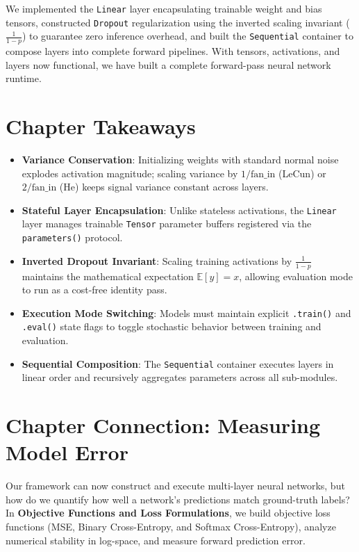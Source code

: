 \documentclass[
  letterpaper,
]{scrbook}
\providecommand{\tightlist}{%
  \setlength{\itemsep}{0pt}\setlength{\parskip}{0pt}}
\begin{document}
We implemented the \texttt{Linear} layer encapsulating trainable weight
and bias tensors, constructed \texttt{Dropout} regularization using the
inverted scaling invariant (\(\frac{1}{1-p}\)) to guarantee zero
inference overhead, and built the \texttt{Sequential} container to
compose layers into complete forward pipelines. With tensors,
activations, and layers now functional, we have built a complete
forward-pass neural network runtime.

\section{Chapter Takeaways}\label{chapter-takeaways-3}

\begin{itemize}
\tightlist
\item
  \textbf{Variance Conservation}: Initializing weights with standard
  normal noise explodes activation magnitude; scaling variance by
  \(1/\text{fan\_in}\) (LeCun) or \(2/\text{fan\_in}\) (He) keeps signal
  variance constant across layers.
\item
  \textbf{Stateful Layer Encapsulation}: Unlike stateless activations,
  the \texttt{Linear} layer manages trainable \texttt{Tensor} parameter
  buffers registered via the \texttt{parameters()} protocol.
\item
  \textbf{Inverted Dropout Invariant}: Scaling training activations by
  \(\frac{1}{1-p}\) maintains the mathematical expectation
  \(\mathbb{E}[y] = x\), allowing evaluation mode to run as a cost-free
  identity pass.
\item
  \textbf{Execution Mode Switching}: Models must maintain explicit
  \texttt{.train()} and \texttt{.eval()} state flags to toggle
  stochastic behavior between training and evaluation.
\item
  \textbf{Sequential Composition}: The \texttt{Sequential} container
  executes layers in linear order and recursively aggregates parameters
  across all sub-modules.
\end{itemize}

\section{Chapter Connection: Measuring Model
Error}\label{chapter-connection-measuring-model-error}

Our framework can now construct and execute multi-layer neural networks,
but how do we quantify how well a network's predictions match
ground-truth labels? In \textbf{Objective Functions and Loss
Formulations}, we build objective loss functions (MSE, Binary
Cross-Entropy, and Softmax Cross-Entropy), analyze numerical stability
in log-space, and measure forward prediction error.
\end{document}
